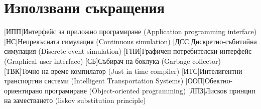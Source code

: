 \chapter{Използвани съкращения}
	\begin{acronym}
		[ИПП]{Интерфейс за приложно програмиране (Application programming interface)}
		[НС]{Непрекъсната симулация (Continuous simulation)}
		[ДСС]{Дискретно-събитийна симулация (Discrete-event simulation)}
		[ГПИ]{Графичен потребителски интерфейс (Graphical user interface)}
		[СБ]{Събирач на боклука (Garbage collector)}
		[ТВК]{Точно на време компилатор (Just in time compiler)}
		[ИТС]{Интелигентни транспортни системи (Intelligent Transportation Systems)}
		[ООП]{Обектно-ориентирано програмиране (Object-oriented programming)}
		[ЛПЗ]{Лисков принцип на заместването (liskov substitution principle)}
	\end{acronym}